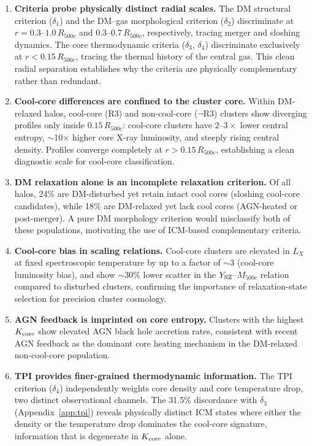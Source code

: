 \documentclass[12pt]{article}
\newcommand{\Rfive}{R_{500c}}
\newcommand{\Kcore}{K_{\rm core}}
\newcommand{\deltai}{\delta_1}
\newcommand{\deltaii}{\delta_2}
\newcommand{\deltaiii}{\delta_3}
\newcommand{\deltaiv}{\delta_4}
\begin{document}
\begin{enumerate}

\item \textbf{Criteria probe physically distinct radial scales.}
  The DM structural criterion ($\deltai$) and the DM--gas morphological criterion
  ($\deltaii$) discriminate at $r = 0.3$--$1.0\,\Rfive$ and $0.3$--$0.7\,\Rfive$,
  respectively, tracing merger and sloshing dynamics.  The core thermodynamic criteria
  ($\deltaiii$, $\deltaiv$) discriminate exclusively at $r < 0.15\,\Rfive$, tracing
  the thermal history of the central gas.  This clean radial separation establishes why
  the criteria are physically complementary rather than redundant.

\item \textbf{Cool-core differences are confined to the cluster core.}
  Within DM-relaxed halos, cool-core (R3) and non-cool-core ($\lnot$R3) clusters show
  diverging profiles only inside $0.15\,\Rfive$: cool-core clusters have
  $2$--$3\times$ lower central entropy, $\sim$10$\times$ higher core X-ray luminosity,
  and steeply rising central density.  Profiles converge completely at $r > 0.15\,\Rfive$,
  establishing a clean diagnostic scale for cool-core classification.

\item \textbf{DM relaxation alone is an incomplete relaxation criterion.}
  Of all halos, 24\% are DM-disturbed yet retain intact cool cores (sloshing cool-core
  candidates), while 18\% are DM-relaxed yet lack cool cores (AGN-heated or post-merger).
  A pure DM morphology criterion would misclassify both of these populations, motivating
  the use of ICM-based complementary criteria.

\item \textbf{Cool-core bias in scaling relations.}
  Cool-core clusters are elevated in $L_X$ at fixed spectroscopic temperature by up to
  a factor of $\sim$3 (cool-core luminosity bias), and show $\sim$30\% lower scatter
  in the $Y_{\rm SZ}$--$M_{500c}$ relation compared to disturbed clusters, confirming
  the importance of relaxation-state selection for precision cluster cosmology.

\item \textbf{AGN feedback is imprinted on core entropy.}
  Clusters with the highest $\Kcore$ show elevated AGN black hole accretion rates,
  consistent with recent AGN feedback as the dominant core heating mechanism in the
  DM-relaxed non-cool-core population.

\item \textbf{TPI provides finer-grained thermodynamic information.}
  The TPI criterion ($\deltaiv$) independently weights core density and core temperature
  drop, two distinct observational channels.  The 31.5\% discordance with $\deltaiii$
  (Appendix~\ref{app:tpi}) reveals physically distinct ICM states where either the
  density or the temperature drop dominates the cool-core signature, information that
  is degenerate in $\Kcore$ alone.

\end{enumerate}
\end{document}

